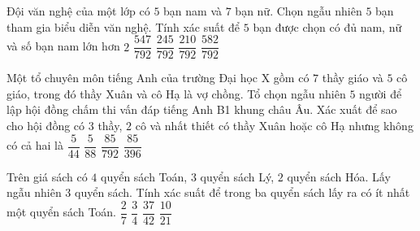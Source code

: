 \begin{ex}%
Đội văn nghệ của một lớp có $5$ bạn nam và $7$ bạn nữ. Chọn ngẫu nhiên $5$ bạn tham gia biểu diễn văn nghệ. Tính xác suất để $5$ bạn được chọn có đủ nam, nữ và số bạn nam lớn hơn $2$
\choice
{$\dfrac{547}{792}$}
{\True $\dfrac{245}{792}$}
{$\dfrac{210}{792}$}
{$\dfrac{582}{792}$}
\end{ex}

\begin{ex}%
Một tổ chuyên môn tiếng Anh của trường Đại học X gồm có $7$ thầy giáo và $5$ cô giáo, trong đó thầy Xuân và cô Hạ là vợ chồng. Tổ chọn ngẫu nhiên $5$ người để lập hội đồng chấm thi vấn đáp tiếng Anh B1 khung châu Âu. Xác xuất để sao cho hội đồng có $3$ thầy, $2$ cô và nhất thiết có thầy Xuân hoặc cô Hạ nhưng không có cả hai là
\choice
{$\dfrac{5}{44}$}
{$\dfrac{5}{88}$}
{$\dfrac{85}{792}$}
{\True $\dfrac{85}{396}$}
\end{ex}

\begin{ex}%
Trên giá sách có $4$ quyển sách Toán, $3$ quyển sách Lý, $2$ quyển sách Hóa. Lấy ngẫu nhiên $3$ quyển sách. Tính xác suất để trong ba quyển sách lấy ra có ít nhất một quyển sách Toán.
\choice
{$\dfrac{2}{7}$}
{$\dfrac{3}{4}$}
{\True $\dfrac{37}{42}$}
{$\dfrac{10}{21}$}
\end{ex}

